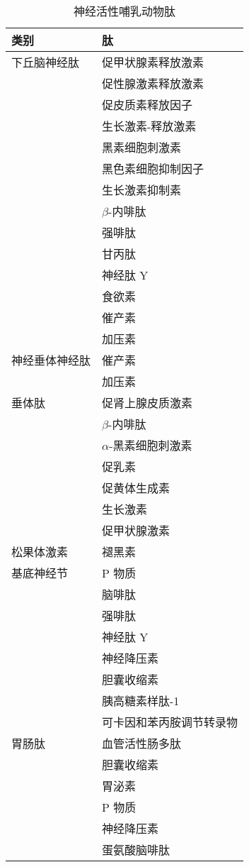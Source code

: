 \begin{table}[htbp]
	\caption{神经活性哺乳动物肽} \label{tab:16_2} \centering
	\begin{tabular}{ll}
		\toprule
		类别 & 肽 \\
		\midrule
		下丘脑神经肽 & 促甲状腺素释放激素  \\
		 & 促性腺激素释放激素  \\
		 & 促皮质素释放因子  \\
		 & 生长激素-释放激素  \\
		 & 黑素细胞刺激素  \\
		 & 黑色素细胞抑制因子  \\
		 & 生长激素抑制素  \\
		 & $\beta$-内啡肽  \\
		 & 强啡肽  \\
		 & 甘丙肽  \\
		 & 神经肽 Y  \\
		 & 食欲素   \\
		 & 催产素   \\
		 & 加压素   \\
		神经垂体神经肽 & 催产素   \\
		 & 加压素   \\
		垂体肽 & 促肾上腺皮质激素   \\
		 & $\beta$-内啡肽   \\
		 & $\alpha$-黑素细胞刺激素   \\
		 & 促乳素   \\
		 & 促黄体生成素   \\
		 & 生长激素   \\
		 & 促甲状腺激素   \\
		松果体激素 & 褪黑素   \\
		基底神经节 & P 物质   \\
		 & 脑啡肽   \\
		 & 强啡肽   \\
		 & 神经肽 Y   \\
		 & 神经降压素   \\
		 & 胆囊收缩素   \\
		 & 胰高糖素样肽-1   \\
		 & 可卡因和苯丙胺调节转录物   \\
		胃肠肽 & 血管活性肠多肽   \\
		 & 胆囊收缩素   \\
		 & 胃泌素   \\
		 & P 物质   \\
		 & 神经降压素   \\
		 & 蛋氨酸脑啡肽   \\

\end{tabular}
\end{table}
